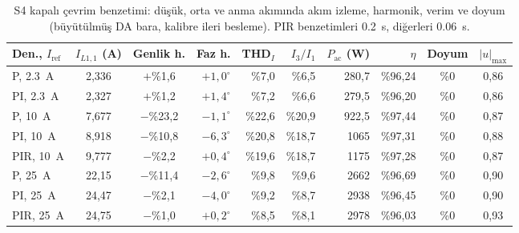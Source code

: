 \begin{table}[htbp]
  \centering
  \caption{S4 kapalı çevrim benzetimi: düşük, orta ve anma akımında akım izleme, harmonik, verim ve doyum (büyütülmüş DA bara, kalibre ileri besleme). PIR benzetimleri \SI{0.2}{\second}, diğerleri \SI{0.06}{\second}.}
  \label{tab:s4-tarama}
  \footnotesize
  \setlength{\tabcolsep}{2.6pt}
  \begin{tabular}{@{}l c c r r r r r c c@{}}
    \toprule
    Den., $I_{\mathrm{ref}}$ & $I_{L1,1}$ (A) & Genlik h. & Faz h. & THD$_I$ & $I_3/I_1$ & $P_{\mathrm{ac}}$ (W) & $\eta$ & Doyum & $|u|_{\max}$ \\
    \midrule
    P, \SI{2.3}{\ampere}   & 2,336 & $+$\%1,6  & $+1{,}0^{\circ}$ & \%7,0  & \%6,5  & 280,7 & \%96,24 & \%0 & 0,86 \\
    PI, \SI{2.3}{\ampere}  & 2,327 & $+$\%1,2  & $+1{,}4^{\circ}$ & \%7,2  & \%6,6  & 279,5 & \%96,20 & \%0 & 0,86 \\
    \midrule
    P, \SI{10}{\ampere}    & 7,677 & $-$\%23,2 & $-1{,}1^{\circ}$ & \%22,6 & \%20,9 & 922,5 & \%97,44 & \%0 & 0,87 \\
    PI, \SI{10}{\ampere}   & 8,918 & $-$\%10,8 & $-6{,}3^{\circ}$ & \%20,8 & \%18,7 & 1065  & \%97,31 & \%0 & 0,88 \\
    PIR, \SI{10}{\ampere}  & 9,777 & $-$\%2,2  & $+0{,}4^{\circ}$ & \%19,6 & \%18,7 & 1175  & \%97,28 & \%0 & 0,87 \\
    \midrule
    P, \SI{25}{\ampere}    & 22,15 & $-$\%11,4 & $-2{,}6^{\circ}$ & \%9,8  & \%9,6  & 2662  & \%96,69 & \%0 & 0,90 \\
    PI, \SI{25}{\ampere}   & 24,47 & $-$\%2,1  & $-4{,}0^{\circ}$ & \%9,2  & \%8,7  & 2938  & \%96,45 & \%0 & 0,90 \\
    PIR, \SI{25}{\ampere}  & 24,75 & $-$\%1,0  & $+0{,}2^{\circ}$ & \%8,5  & \%8,1  & 2978  & \%96,03 & \%0 & 0,93 \\
    \bottomrule
  \end{tabular}
\end{table}


